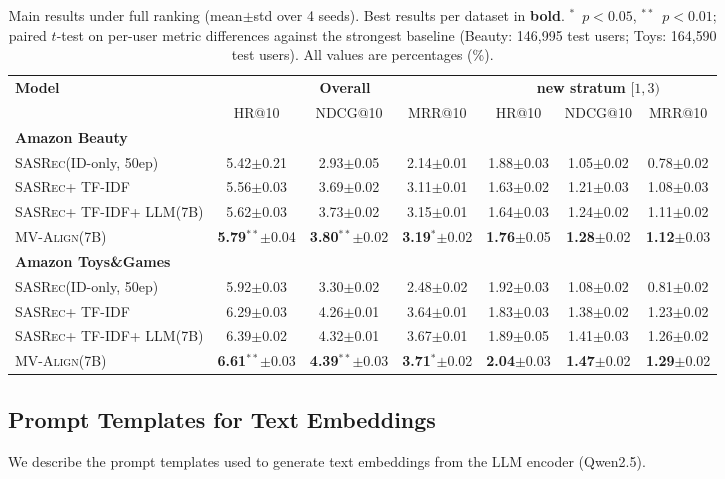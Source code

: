 \documentclass[sigconf,natbib=true,anonymous]{acmart}
\newcommand{\model}{\textsc{MV-Align}\xspace}
\newcommand{\base}{\textsc{SASRec}\xspace}
\newcommand{\tfidf}{\textsc{TF-IDF}\xspace}
\newcommand{\llm}{\textsc{LLM}\xspace}
\begin{document}
\begin{table}[t]
\caption{Main results under full ranking (mean$\pm$std over 4 seeds). Best results per dataset in \textbf{bold}. $^{*}$~$p{<}0.05$, $^{**}$~$p{<}0.01$; paired $t$-test on per-user metric differences against the strongest baseline (Beauty: 146{,}995 test users; Toys: 164{,}590 test users). All values are percentages (\%).}
\label{tab:main}
\centering
\small
\begin{tabular}{lcccccc}
\toprule
\multirow{2}{*}{\textbf{Model}} &
\multicolumn{3}{c}{\textbf{Overall}} &
\multicolumn{3}{c}{\textbf{new stratum} $[1,3)$} \\
\cmidrule(lr){2-4}\cmidrule(lr){5-7}
& HR@10 & NDCG@10 & MRR@10 & HR@10 & NDCG@10 & MRR@10 \\
\midrule
\multicolumn{7}{l}{\textbf{Amazon Beauty}} \\
\base (ID-only, 50ep) & 5.42$\pm$0.21 & 2.93$\pm$0.05 & 2.14$\pm$0.01 & 1.88$\pm$0.03 & 1.05$\pm$0.02 & 0.78$\pm$0.02 \\
\base + \tfidf & 5.56$\pm$0.03 & 3.69$\pm$0.02 & 3.11$\pm$0.01 & 1.63$\pm$0.02 & 1.21$\pm$0.03 & 1.08$\pm$0.03 \\
\base + \tfidf + \llm (7B) & 5.62$\pm$0.03 & 3.73$\pm$0.02 & 3.15$\pm$0.01 & 1.64$\pm$0.03 & 1.24$\pm$0.02 & 1.11$\pm$0.02 \\
\model (7B) & \textbf{5.79}$^{**}$$\pm$0.04 & \textbf{3.80}$^{**}$$\pm$0.02 & \textbf{3.19}$^{*}$$\pm$0.02 & \textbf{1.76}$\pm$0.05 & \textbf{1.28}$\pm$0.02 & \textbf{1.12}$\pm$0.03 \\
\midrule
\multicolumn{7}{l}{\textbf{Amazon Toys\&Games}} \\
\base (ID-only, 50ep) & 5.92$\pm$0.03 & 3.30$\pm$0.02 & 2.48$\pm$0.02 & 1.92$\pm$0.03 & 1.08$\pm$0.02 & 0.81$\pm$0.02 \\
\base + \tfidf & 6.29$\pm$0.03 & 4.26$\pm$0.01 & 3.64$\pm$0.01 & 1.83$\pm$0.03 & 1.38$\pm$0.02 & 1.23$\pm$0.02 \\
\base + \tfidf + \llm (7B) & 6.39$\pm$0.02 & 4.32$\pm$0.01 & 3.67$\pm$0.01 & 1.89$\pm$0.05 & 1.41$\pm$0.03 & 1.26$\pm$0.02 \\
\model (7B) & \textbf{6.61}$^{**}$$\pm$0.03 & \textbf{4.39}$^{**}$$\pm$0.03 & \textbf{3.71}$^{*}$$\pm$0.02 & \textbf{2.04}$\pm$0.03 & \textbf{1.47}$\pm$0.02 & \textbf{1.29}$\pm$0.02 \\
\bottomrule
\end{tabular}
\end{table}

\subsection{Prompt Templates for Text Embeddings}
We describe the prompt templates used to generate text
embeddings from the LLM encoder (Qwen2.5).
\end{document}

